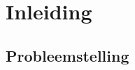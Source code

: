 
\chapter{Inleiding}
\label{ch:inleiding}

%

\section{Probleemstelling}
\label{sec:probleemstelling}



